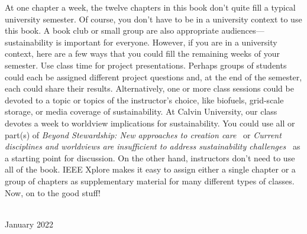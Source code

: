 {    At one chapter a week, the twelve chapters in this book don't quite fill a typical 
university semester. 
Of course, you don't have to be in a university context to use this book. 
    A book club or small group are also appropriate audiences---sustainability 
    is important for everyone. 
    However, if you are in a university context, here are a few ways that you could fill the 
    remaining weeks of your semester. 
    Use class time for project presentations. 
    Perhaps groups of students could each be assigned different project questions and, 
    at the end of the semester, each could share their results.
    Alternatively, one or more class sessions could be devoted to a topic or topics 
    of the instructor's choice, like biofuels, grid-scale storage, 
or media coverage of sustainability. 
At Calvin University, our class devotes a week to worldview implications for 
sustainability. 
You could use all or part(s) of \emph{Beyond Stewardship: New approaches to 
creation care}~\citep{Warners:2019aa}
or \emph{Current disciplines and worldviews are insufficient
to address sustainability challenges}~\cite{VanH2019} as a starting point for discussion. 
On the other hand, instructors don't need to use all of the book. 
    IEEE Xplore makes it easy to assign either a single chapter or a group of chapters 
    as supplementary material for many different types of classes.
    Now, on to the good stuff!
      
      \vspace*{2pc}
    \noindent\AUTHORS\\
    \noindent January 2022
  }
  
  
  
  
  
  
  
  \cleardoublepage
